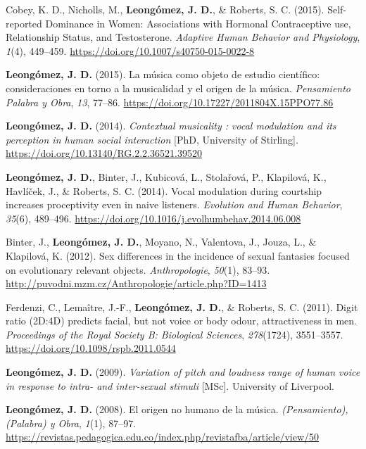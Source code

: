 \documentclass[11pt, a4paper]{awesome-cv}
\begin{document}
\leavevmode\hypertarget{ref-Cobey2015}{}%
Cobey, K. D., Nicholls, M., \textbf{Leongómez, J. D.}, \& Roberts, S. C.
(2015). {Self-reported Dominance in Women: Associations with Hormonal
Contraceptive use, Relationship Status, and Testosterone}.
\emph{Adaptive Human Behavior and Physiology}, \emph{1}(4), 449--459.
\url{https://doi.org/10.1007/s40750-015-0022-8}

\leavevmode\hypertarget{ref-Leongomez2015}{}%
\textbf{Leongómez, J. D.} (2015). {La m{ú}sica como objeto de estudio
cient{í}fico: consideraciones en torno a la musicalidad y el origen de
la m{ú}sica}. \emph{Pensamiento Palabra y Obra}, \emph{13}, 77--86.
\url{https://doi.org/10.17227/2011804X.15PPO77.86}

\leavevmode\hypertarget{ref-Leongomez2014a}{}%
\textbf{Leongómez, J. D.} (2014). \emph{{Contextual musicality : vocal
modulation and its perception in human social interaction}} {[}PhD,
University of Stirling{]}.
\url{https://doi.org/10.13140/RG.2.2.36521.39520}

\leavevmode\hypertarget{ref-Leongomez2014}{}%
\textbf{Leongómez, J. D.}, Binter, J., Kubicová, L., Stolařová, P.,
Klapilová, K., Havlíček, J., \& Roberts, S. C. (2014). {Vocal modulation
during courtship increases proceptivity even in naive listeners}.
\emph{Evolution and Human Behavior}, \emph{35}(6), 489--496.
\url{https://doi.org/10.1016/j.evolhumbehav.2014.06.008}

\leavevmode\hypertarget{ref-Binter2012}{}%
Binter, J., \textbf{Leongómez, J. D.}, Moyano, N., Valentova, J., Jouza,
L., \& Klapilová, K. (2012). {Sex differences in the incidence of sexual
fantasies focused on evolutionary relevant objects.}
\emph{Anthropologie}, \emph{50}(1), 83--93.
\url{http://puvodni.mzm.cz/Anthropologie/article.php?ID=1413}

\leavevmode\hypertarget{ref-Ferdenzi2011}{}%
Ferdenzi, C., Lemaître, J.-F., \textbf{Leongómez, J. D.}, \& Roberts, S.
C. (2011). {Digit ratio (2D:4D) predicts facial, but not voice or body
odour, attractiveness in men.} \emph{Proceedings of the Royal Society B:
Biological Sciences}, \emph{278}(1724), 3551--3557.
\url{https://doi.org/10.1098/rspb.2011.0544}

\leavevmode\hypertarget{ref-Leongomez2009}{}%
\textbf{Leongómez, J. D.} (2009). \emph{{Variation of pitch and loudness
range of human voice in response to intra- and inter-sexual stimuli}}
{[}MSc{]}. University of Liverpool.

\leavevmode\hypertarget{ref-Leongomez2008}{}%
\textbf{Leongómez, J. D.} (2008). {El origen no humano de la m{ú}sica}.
\emph{(Pensamiento), (Palabra) y Obra}, \emph{1}(1), 87--97.
\url{https://revistas.pedagogica.edu.co/index.php/revistafba/article/view/50}
\end{document}
